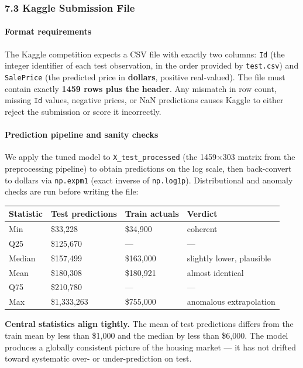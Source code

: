 \subsubsection{7.3 Kaggle Submission File}\label{kaggle-submission-file}

\paragraph{Format requirements}\label{format-requirements}

The Kaggle competition expects a CSV file with exactly two columns:
\texttt{Id} (the integer identifier of each test observation, in the
order provided by \texttt{test.csv}) and \texttt{SalePrice} (the
predicted price in \textbf{dollars}, positive real-valued). The file
must contain exactly \textbf{1459 rows plus the header}. Any mismatch in
row count, missing \texttt{Id} values, negative prices, or NaN
predictions causes Kaggle to either reject the submission or score it
incorrectly.

\paragraph{Prediction pipeline and sanity
checks}\label{prediction-pipeline-and-sanity-checks}

We apply the tuned model to \texttt{X\_test\_processed} (the 1459×303
matrix from the preprocessing pipeline) to obtain predictions on the log
scale, then back-convert to dollars via \texttt{np.expm1} (exact inverse
of \texttt{np.log1p}). Distributional and anomaly checks are run before
writing the file:

\begin{longtable}[]{@{}llll@{}}
\toprule\noalign{}
Statistic & Test predictions & Train actuals & Verdict \\
\midrule\noalign{}
\endhead
\bottomrule\noalign{}
\endlastfoot
Min & \$33,228 & \$34,900 & coherent \\
Q25 & \$125,670 & --- & --- \\
Median & \$157,499 & \$163,000 & slightly lower, plausible \\
Mean & \$180,308 & \$180,921 & almost identical \\
Q75 & \$210,780 & --- & --- \\
Max & \$1,333,263 & \$755,000 & anomalous extrapolation \\
\end{longtable}

\textbf{Central statistics align tightly.} The mean of test predictions
differs from the train mean by less than \$1,000 and the median by less
than \$6,000. The model produces a globally consistent picture of the
housing market --- it has not drifted toward systematic over- or
under-prediction on test.

